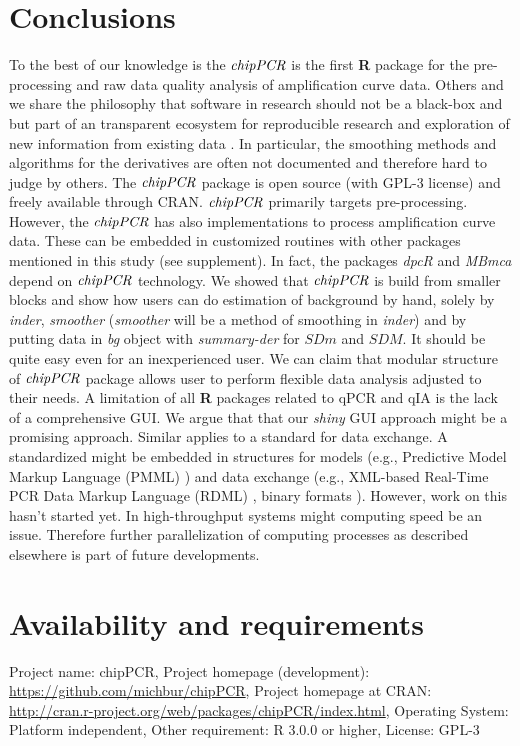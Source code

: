\documentclass[twocolumn]{bmcart}%
\begin{document}
\section*{Conclusions}

To the best of our knowledge is the $\emph{chipPCR}$ is the first \textbf{R} 
package for the pre-processing and raw data quality analysis of amplification 
curve data. Others and we share the philosophy that software in research should 
not be a black-box and but part of an transparent ecosystem for reproducible 
research and exploration of new information from existing data 
\cite{Thioulouse_2010, roediger_RJ_2013, hofmann_2013, Leeper_2014, liu_2014}. 
In particular, the smoothing methods and algorithms for the derivatives are 
often not documented and therefore hard to judge by others. The $\emph{chipPCR}$ 
package is open source (with GPL-3 license) and freely available through CRAN. 
$\emph{chipPCR}$ primarily targets pre-processing. However, the $\emph{chipPCR}$ 
has also implementations to process amplification curve data. These can be 
embedded in customized routines with other packages mentioned in this study 
(see supplement). In fact, the packages \emph{dpcR} and \emph{MBmca} depend on 
$\emph{chipPCR}$ technology. We showed that $\emph{chipPCR}$ is build from 
smaller blocks and show how users can do estimation of background by hand, 
solely by \textsl{inder}, \textsl{smoother} (\textsl{smoother} will be a method 
of smoothing in \textsl{inder}) and by putting data in \textsl{bg} object with 
\textsl{summary-der} for $SDm$ and $SDM$. It should be quite easy even for an 
inexperienced user. We can claim that modular structure of $\emph{chipPCR}$ 
package allows user to perform flexible data analysis adjusted to their needs. A 
limitation of all \textbf{R} packages related to qPCR and qIA is the lack of a 
comprehensive GUI. We argue that that our \emph{shiny} GUI approach might be a 
promising approach. Similar applies to a standard for data exchange. A 
standardized might be embedded in structures for models (e.g., Predictive Model 
Markup Language (PMML) \cite{Guazzelli_2009}) and data exchange (e.g., XML-based 
Real-Time PCR Data Markup Language (RDML) \cite{lefever_2009}, binary formats 
\cite{michna_2013}). However, work on this hasn't started yet. In 
high-throughput systems might computing speed be an issue. Therefore further 
parallelization of computing processes as described elsewhere 
\cite{Schmidberger_2009, boehringer_2013} is part of future developments. 

\section*{Availability and requirements}
Project name: chipPCR, 
Project homepage (development):
\url{https://github.com/michbur/chipPCR}, 
Project homepage at CRAN: 
\url{http://cran.r-project.org/web/packages/chipPCR/index.html}, 
Operating System: Platform independent, 
Other requirement: R 3.0.0 or higher, 
License: GPL-3
\end{document}
